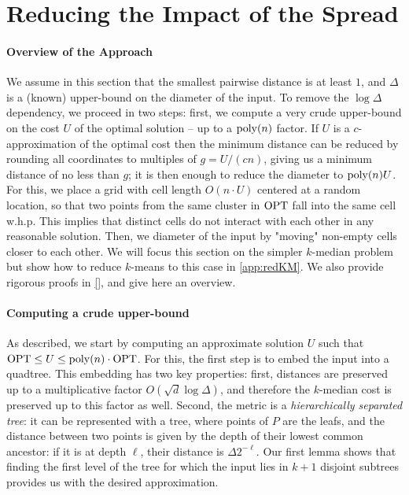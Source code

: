 \section{Reducing the Impact of the Spread}
\label{sec:logdelta}
\newcommand{\boxsize}{\textsc{MaxDist}}

\paragraph*{Overview of the Approach}
We assume in this section that the smallest pairwise distance is at least $1$, and $\Delta$ is a (known) upper-bound on the diameter of the input.
To remove the $\log\Delta$ dependency, we proceed in two steps: first, we compute a very crude upper-bound on the cost $U$ of the optimal solution -- up to
a $\operatorname{poly}(n)$ factor.  If $U$ is a $c$-approximation of the optimal cost then the minimum distance can be reduced by rounding all coordinates to multiples of $g
= U/(cn)$, giving us a minimum distance of no less than $g$; it is then enough to reduce the diameter to $\operatorname{poly}(n) U$.  For this, we place a grid with cell length
$O(n \cdot U)$ centered at a random location, so that two points from the same cluster in $\text{OPT}$ fall into the same cell w.h.p. This implies that distinct cells do not interact with each other
in any reasonable solution.  Then, we diameter of the input by "moving" non-empty cells closer to each other. We will focus this section on the simpler $k$-median
problem but show how to reduce $k$-means to this case in \cref{app:redKM}. We also provide rigorous proofs in \ref{}, and give here an overview.

\paragraph*{Computing a crude upper-bound}

As described, we start by computing an approximate solution $U$ such that $\text{OPT} \leq U \leq \operatorname{poly}(n) \cdot \text{OPT}$. For this, the first step is to embed the input
into a quadtree. This embedding has two key properties: first, distances are preserved up to a multiplicative factor $O(\sqrt{d} \log \Delta)$, and therefore
the $k$-median cost is preserved up to this factor as well. Second, the metric is a \emph{hierarchically separated tree}: it can be represented with a tree,
where points of $P$ are the leafs, and the distance between two points is given by the depth of their lowest common ancestor: if it is at depth $\ell$, their
distance is $\Delta 2^{-\ell}$.  Our first lemma shows that finding the first level of the tree for which the input lies in $k+1$ disjoint subtrees provides us
with the desired approximation. 

